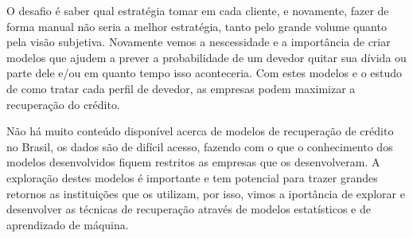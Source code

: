     O desafio é saber qual estratégia tomar em cada cliente, e novamente, fazer de forma manual não seria a melhor estratégia, tanto pelo grande volume quanto pela visão subjetiva. Novamente vemos a nescessidade e a importância de criar modelos que ajudem a prever a probabilidade de um devedor quitar sua dívida ou parte dele e/ou em quanto tempo isso aconteceria. Com estes modelos e o estudo de como tratar cada perfil de devedor, as empresas podem maximizar a recuperação do crédito.
    
    Não há muito conteúdo disponível acerca de modelos de recuperação de crédito no Brasil, os dados são de difícil acesso, fazendo com o que o conhecimento dos modelos desenvolvidos fiquem restritos as empresas que os desenvolveram. A exploração destes modelos é importante e tem potencial para trazer grandes retornos as instituições que os utilizam, por isso, vimos a iportância de explorar e desenvolver as técnicas de recuperação através de modelos estatísticos e de aprendizado de máquina.
